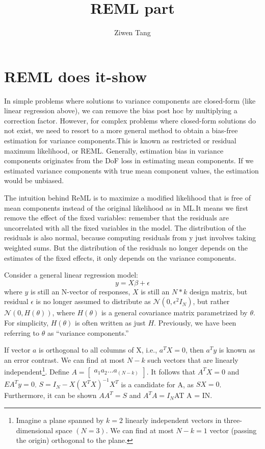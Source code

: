 \documentclass[a4paper,11pt]{article}
\begin{document}
  
\title{REML part}
\author{Ziwen Tang}
\maketitle

\section{REML does it-show}

In simple problems where solutions to variance components are closed-form (like linear regression above), we can remove the bias post hoc by multiplying a correction factor. However, for complex problems where closed-form solutions do not exist, we need to resort to a more general method to obtain a bias-free estimation for variance components.This is known as restricted or residual maximum likelihood, or REML. Generally, estimation bias in variance components originates from the DoF loss in estimating mean components. If we estimated variance components with true mean component values, the estimation would be unbiased. 

The intuition behind ReML is to maximize a modified likelihood that is free of mean components instead of the original likelihood as in ML.It means we first remove the effect of the fixed variables: remember that the residuals are uncorrelated with all the fixed variables in the model. The distribution of the residuals is also normal, because computing residuals from y just involves taking weighted sums. But the distribution of the residuals no longer depends on the estimates of the fixed effects, it only depends on the variance components.

Consider a general linear regression model:
\begin{equation}\label{eq:0} 
         y= X\beta + \epsilon
\end{equation}
where $y$ is still an N-vector of responses, $X$ is still an $N*k$ design matrix, but residual $\epsilon$ is no longer assumed to distribute as $\mathcal{N}(0,\epsilon^2I_N)$, but rather $\mathcal{N} (0, H(\theta))$, where $H(\theta)$ is a general covariance matrix parametrized by $\theta$. For simplicity, $H(\theta)$ is often written as just $H$. Previously, we have been referring to $\theta$ as “variance components.”

If vector $a$ is orthogonal to all columns of X, i.e., $a^T X = 0 $, then $a^T y$ is known as an error contrast. We can find at most $N-k$ such vectors that are linearly independent\footnote{ Imagine a plane spanned by $k = 2$ linearly independent vectors in three-dimensional space $(N = 3)$. We can find at most $N - k = 1$ vector (passing the origin) orthogonal to the plane.}. Define $A =\begin{bmatrix} a_1 a_2 ... a_(N-k) \end{bmatrix}$. It follows that $A^T X = 0$ and $E{A^T y} = 0$. $S = I_N - X(X^T X)^{-1} X^T $ is a candidate for A, as $SX = 0$. Furthermore, it can be shown $A A^T = S$ and $A^T A = I_N$AT A = IN.
\end{document}
